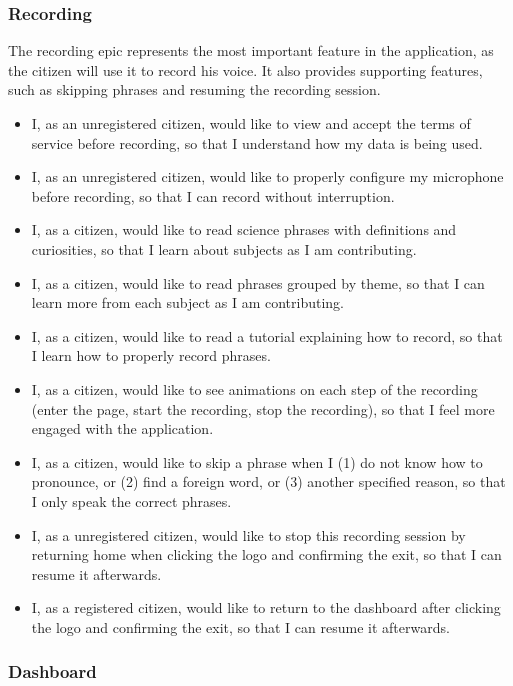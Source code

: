 \subsubsection{Recording}

The recording epic represents the most important feature in the application, as the citizen will use it to record his voice. It also provides supporting features, such as skipping phrases and resuming the recording session.

\begin{itemize}
    \item I, as an unregistered citizen, would like to view and accept the terms of service before recording, so that I understand how my data is being used.
    \item I, as an unregistered citizen, would like to properly configure my microphone before recording, so that I can record without interruption.
    \item I, as a citizen, would like to read science phrases with definitions and curiosities, so that I learn about subjects as I am contributing.
    \item I, as a citizen, would like to read phrases grouped by theme, so that I can learn more from each subject as I am contributing.
    \item I, as a citizen, would like to read a tutorial explaining how to record, so that I learn how to properly record phrases.
    \item I, as a citizen, would like to see animations on each step of the recording (enter the page, start the recording, stop the recording), so that I feel more engaged with the application.
    \item I, as a citizen, would like to skip a phrase when I (1) do not know how to pronounce, or (2) find a foreign word, or (3) another specified reason, so that I only speak the correct phrases.
    \item I, as a unregistered citizen, would like to stop this recording session by returning home when clicking the logo and confirming the exit, so that I can resume it afterwards.
    \item I, as a registered citizen, would like to return to the dashboard after clicking the logo and confirming the exit, so that I can resume it afterwards.
\end{itemize}

\subsubsection{Dashboard}

